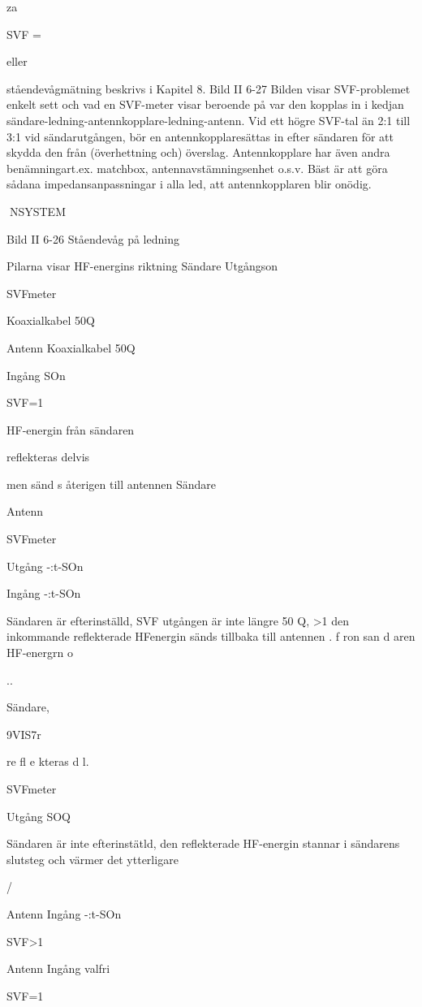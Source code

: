 \documentclass[a4paper,twoside,twocolumn,openright]{book}
\begin{document}
{{{{{za

SVF =

eller

ståendevågmätning beskrivs i Kapitel 8.
Bild II 6-27
Bilden visar SVF-problemet enkelt sett
och vad en SVF-meter visar beroende på
var den kopplas in i kedjan sändare-ledning-antennkopplare-ledning-antenn.
Vid ett högre SVF-tal än 2:1 till 3:1 vid
sändarutgången, bör en antennkopplaresättas in efter sändaren för att skydda den från
(överhettning och) överslag. Antennkopplare har även andra benämningart.ex. matchbox, antennavstämningsenhet o.s.v. Bäst
är att göra sådana impedansanpassningar i
alla led, att antennkopplaren blir onödig.

NSYSTEM

Bild II 6-26 Ståendevåg på ledning

Pilarna visar HF-energins riktning
Sändare
Utgångson

SVFmeter

Koaxialkabel 50Q

Antenn
Koaxialkabel 50Q

Ingång SOn

SVF=1

HF-energin från sändaren

reflekteras delvis

men sänd s återigen till antennen
Sändare

Antenn

SVFmeter

Utgång
-:t-SOn

Ingång
-:t-SOn

Sändaren är efterinställd,
SVF
utgången är inte längre 50 Q,
>1
den inkommande reflekterade HFenergin sänds tillbaka till antennen
. f ron san d aren
HF-energrn
o

..

Sändare,\

9VIS7r

re fl e kteras d l.

SVFmeter

Utgång SOQ

Sändaren är inte efterinstätld,
den reflekterade HF-energin
stannar i sändarens slutsteg
och värmer det ytterligare

/

Antenn
Ingång
-:t-SOn

SVF>1

Antenn
Ingång
valfri

SVF=1

~

}}}}}
\end{document}
